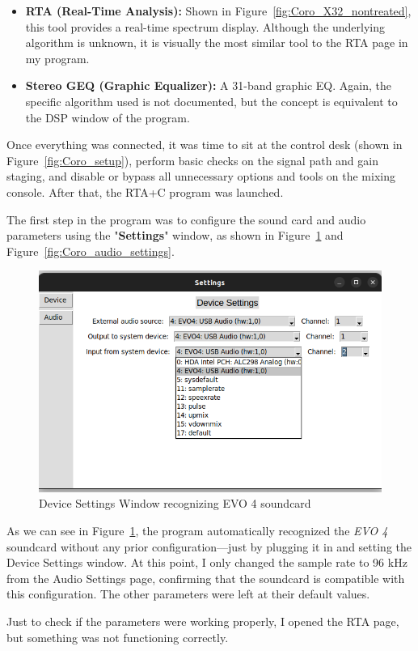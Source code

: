 \begin{itemize}
	\item \textbf{RTA (Real-Time Analysis):} Shown in Figure~\ref{fig:Coro_X32_nontreated}, this tool provides a real-time spectrum display. Although the underlying algorithm is unknown, it is visually the most similar tool to the RTA page in my program.
	\item \textbf{Stereo GEQ (Graphic Equalizer):} A 31-band graphic EQ. Again, the specific algorithm used is not documented, but the concept is equivalent to the DSP window of the program.
\end{itemize}

Once everything was connected, it was time to sit at the control desk (shown in Figure~\ref{fig:Coro_setup}), perform basic checks on the signal path and gain staging, and disable or bypass all unnecessary options and tools on the mixing console. After that, the RTA+C program was launched.

The first step in the program was to configure the sound card and audio parameters using the "\textbf{Settings}" window, as shown in Figure~\ref{fig:Coro_device_settings} and Figure~\ref{fig:Coro_audio_settings}.


\begin{figure}[H]
	\centering
	\includegraphics[width=0.6
	\linewidth]{Figures/Coro_Device_settings.png}
	\caption{Device Settings Window recognizing EVO 4 soundcard}
	\label{fig:Coro_device_settings}
\end{figure}

As we can see in Figure~\ref{fig:Coro_device_settings}, the program automatically recognized the \textit{EVO 4} soundcard without any prior configuration—just by plugging it in and setting the Device Settings window. At this point, I only changed the sample rate to 96 kHz from the Audio Settings page, confirming that the soundcard is compatible with this configuration. The other parameters were left at their default values.

Just to check if the parameters were working properly, I opened the RTA page, but something was not functioning correctly.

